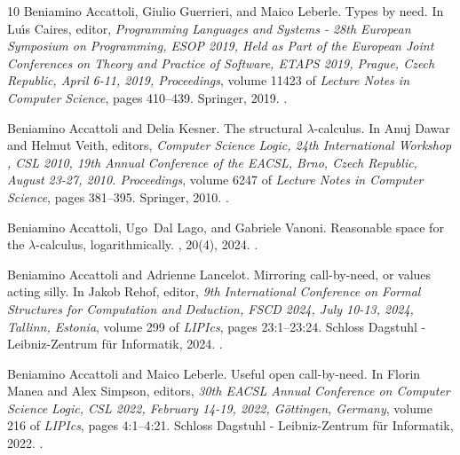 \begin{thebibliography}{10}
Beniamino Accattoli, Giulio Guerrieri, and Maico Leberle.
\newblock Types by need.
\newblock In Lu{\'{\i}}s Caires, editor, {\em Programming Languages and Systems
  - 28th European Symposium on Programming, {ESOP} 2019, Held as Part of the
  European Joint Conferences on Theory and Practice of Software, {ETAPS} 2019,
  Prague, Czech Republic, April 6-11, 2019, Proceedings}, volume 11423 of {\em
  Lecture Notes in Computer Science}, pages 410--439. Springer, 2019.
\newblock \href {https://doi.org/10.1007/978-3-030-17184-1\_15}
  {}.

Beniamino Accattoli and Delia Kesner.
\newblock The structural $\lambda$-calculus.
\newblock In Anuj Dawar and Helmut Veith, editors, {\em Computer Science Logic,
  24th International Workshop , {CSL} 2010, 19th Annual Conference of the
  EACSL, Brno, Czech Republic, August 23-27, 2010. Proceedings}, volume 6247 of
  {\em Lecture Notes in Computer Science}, pages 381--395. Springer, 2010.
\newblock \href {https://doi.org/10.1007/978-3-642-15205-4\_30}
  {}.

Beniamino Accattoli, Ugo~Dal Lago, and Gabriele Vanoni.
\newblock Reasonable space for the {\(\lambda\)}-calculus, logarithmically.
, 20(4), 2024.
\newblock \href {https://doi.org/10.46298/LMCS-20(4:15)2024}
  {}.

Beniamino Accattoli and Adrienne Lancelot.
\newblock Mirroring call-by-need, or values acting silly.
\newblock In Jakob Rehof, editor, {\em 9th International Conference on Formal
  Structures for Computation and Deduction, {FSCD} 2024, July 10-13, 2024,
  Tallinn, Estonia}, volume 299 of {\em LIPIcs}, pages 23:1--23:24. Schloss
  Dagstuhl - Leibniz-Zentrum f{\"{u}}r Informatik, 2024.
\newblock \href {https://doi.org/10.4230/LIPICS.FSCD.2024.23}
  {}.

Beniamino Accattoli and Maico Leberle.
\newblock Useful open call-by-need.
\newblock In Florin Manea and Alex Simpson, editors, {\em 30th {EACSL} Annual
  Conference on Computer Science Logic, {CSL} 2022, February 14-19, 2022,
  G{\"{o}}ttingen, Germany}, volume 216 of {\em LIPIcs}, pages 4:1--4:21.
  Schloss Dagstuhl - Leibniz-Zentrum f{\"{u}}r Informatik, 2022.
\newblock \href {https://doi.org/10.4230/LIPICS.CSL.2022.4}
  {}.


\end{thebibliography}
